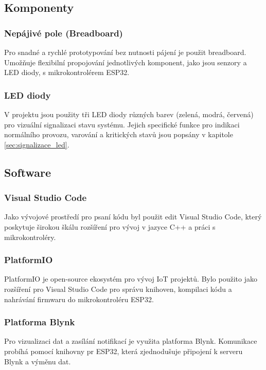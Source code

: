 \documentclass[12pt, twoside]{article} %
\begin{document}
\subsection{Komponenty}
\subsubsection{Nepájivé pole (Breadboard)}
Pro snadné a rychlé prototypování bez nutnosti pájení je použit breadboard. Umožňuje flexibilní propojování jednotlivých komponent, jako jsou senzory a LED diody, s mikrokontrolérem ESP32.

\subsubsection{LED diody}
V projektu jsou použity tři LED diody různých barev (zelená, modrá, červená) pro vizuální signalizaci stavu systému. Jejich specifické funkce pro indikaci normálního provozu, varování a kritických stavů jsou popsány v kapitole \ref{sec:signalizace_led}.

\subsection{Software}
\subsubsection{Visual Studio Code}
Jako vývojové prostředí pro psaní kódu byl použit edit Visual Studio Code, který poskytuje širokou škálu rozšíření pro vývoj v jazyce C++ a práci s mikrokontroléry.

\subsubsection{PlatformIO}
PlatformIO je open-source ekosystém pro vývoj IoT projektů. Bylo použito jako rozšíření pro Visual Studio Code pro správu knihoven, kompilaci kódu a nahrávání firmwaru do mikrokontroléru ESP32.

\subsubsection{Platforma Blynk}
Pro vizualizaci dat a zasílání notifikací je využita platforma Blynk. Komunikace probíhá pomocí knihovny pr ESP32, která zjednodušuje připojení k serveru Blynk a výměnu dat.

\newpage
\end{document}
